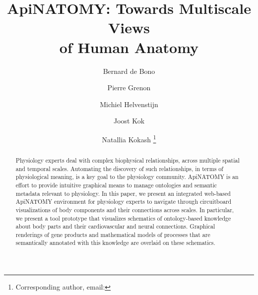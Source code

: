 \documentclass[runningheads]{llncs}                                                      %
\begin{document}

\title{ApiNATOMY: Towards Multiscale Views\\of Human Anatomy}

\author{
  Bernard de Bono
  \and
  Pierre Grenon
  \and
  Michiel Helvenstijn
  \and 	
  Joost Kok
  \and
  Natallia Kokash
  \fnmsep
  \thanks{Corresponding author, email: }
}


\maketitle

\setlength{\subfigcapskip}{0.1cm}
\setlength{\abovecaptionskip}{0cm}
\setlength{\belowcaptionskip}{0cm}
\setlength{\textfloatsep}{10pt plus 1.0pt minus 2.0pt}


\begin{abstract}
Physiology experts deal with complex biophysical relationships, across multiple spatial and temporal scales.
Automating the discovery of such relationships, in terms of physiological meaning, is a key goal to the physiology community.
ApiNATOMY is an effort to provide intuitive graphical means to manage ontologies and semantic metadata relevant to physiology. In this paper, we present an integrated web-based ApiNATOMY environment for physiology experts to navigate through circuitboard visualizations of body components and their connections across scales. In particular, we present a tool prototype that visualizes schematics of ontology-based knowledge about body parts and their cardiovascular and neural connections. Graphical renderings of gene products and mathematical models of processes that are semantically annotated with this knowledge are overlaid on these schematics.
\end{abstract}













\end{document}
